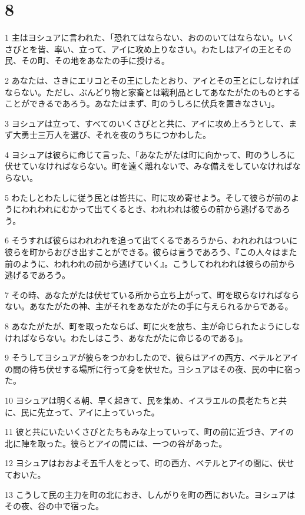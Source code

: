 \chapter{8}

\par 1 主はヨシュアに言われた、「恐れてはならない、おののいてはならない。いくさびとを皆、率い、立って、アイに攻め上りなさい。わたしはアイの王とその民、その町、その地をあなたの手に授ける。
\par 2 あなたは、さきにエリコとその王にしたとおり、アイとその王とにしなければならない。ただし、ぶんどり物と家畜とは戦利品としてあなたがたのものとすることができるであろう。あなたはまず、町のうしろに伏兵を置きなさい」。
\par 3 ヨシュアは立って、すべてのいくさびとと共に、アイに攻め上ろうとして、まず大勇士三万人を選び、それを夜のうちにつかわした。
\par 4 ヨシュアは彼らに命じて言った、「あなたがたは町に向かって、町のうしろに伏せていなければならない。町を遠く離れないで、みな備えをしていなければならない。
\par 5 わたしとわたしに従う民とは皆共に、町に攻め寄せよう。そして彼らが前のようにわれわれにむかって出てくるとき、われわれは彼らの前から逃げるであろう。
\par 6 そうすれば彼らはわれわれを追って出てくるであろうから、われわれはついに彼らを町からおびき出すことができる。彼らは言うであろう、『この人々はまた前のように、われわれの前から逃げていく』。こうしてわれわれは彼らの前から逃げるであろう。
\par 7 その時、あなたがたは伏せている所から立ち上がって、町を取らなければならない。あなたがたの神、主がそれをあなたがたの手に与えられるからである。
\par 8 あなたがたが、町を取ったならば、町に火を放ち、主が命じられたようにしなければならない。わたしはこう、あなたがたに命じるのである」。
\par 9 そうしてヨシュアが彼らをつかわしたので、彼らはアイの西方、ベテルとアイの間の待ち伏せする場所に行って身を伏せた。ヨシュアはその夜、民の中に宿った。
\par 10 ヨシュアは明くる朝、早く起きて、民を集め、イスラエルの長老たちと共に、民に先立って、アイに上っていった。
\par 11 彼と共にいたいくさびとたちもみな上っていって、町の前に近づき、アイの北に陣を取った。彼らとアイの間には、一つの谷があった。
\par 12 ヨシュアはおおよそ五千人をとって、町の西方、ベテルとアイの間に、伏せておいた。
\par 13 こうして民の主力を町の北におき、しんがりを町の西においた。ヨシュアはその夜、谷の中で宿った。
